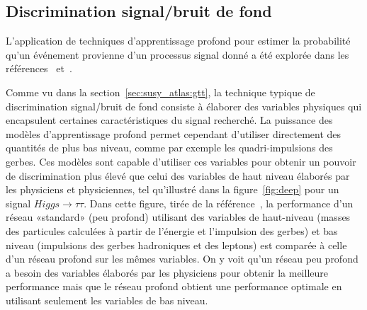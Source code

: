 \subsection{Discrimination signal/bruit de fond}
\label{sec:susy_atlas:dl:evt}

L'application de techniques d'apprentissage profond pour estimer la
probabilité qu'un événement provienne d'un processus signal donné a
été explorée dans les références~\cite{baldi_enhanced_2015} et~\cite{baldi_searching_2014}.

Comme vu dans la section~\ref{sec:susy_atlas:gtt}, la technique typique de discrimination
signal/bruit de fond consiste à élaborer des variables physiques qui
encapsulent certaines caractéristiques du signal recherché. La
puissance des modèles d'apprentissage profond permet cependant
d'utiliser directement des quantités de plus bas niveau, comme par
exemple les quadri-impulsions des gerbes. Ces modèles sont capable d'utiliser
ces variables pour obtenir un pouvoir de discrimination plus élevé que
celui des variables de haut niveau élaborés par les physiciens et physiciennes, tel
qu'illustré dans la figure~\ref{fig:deep} pour un signal
$Higgs \rightarrow\tau\tau$.  Dans cette figure, tirée de la
référence~\cite{baldi_searching_2014}, la performance d'un réseau
«standard» (peu profond) utilisant des variables de haut-niveau
(masses des particules calculées à partir de l'énergie et l'impulsion
des gerbes) et bas niveau (impulsions des gerbes hadroniques et des
leptons) est comparée à celle d'un réseau profond sur les mêmes
variables. On y voit qu'un réseau peu profond a besoin des variables
élaborés par les physiciens pour obtenir la meilleure performance mais
que le réseau profond obtient une performance optimale en
utilisant seulement les variables de bas niveau.

